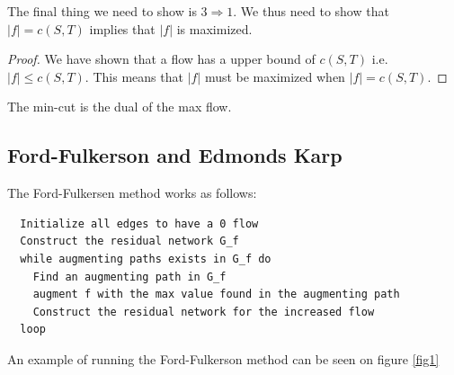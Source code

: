\documentclass[10pt]{article}
\begin{document}
The final thing we need to show is $3 \Rightarrow 1$. We thus need to show that $|f| = c(S,T)$ implies that $|f|$ is maximized. 

\begin{proof}
  We have shown that a flow has a upper bound of $c(S,T)$ i.e. $|f| \leq c(S,T)$. This means that $|f|$ must be maximized when $|f| = c(S,T)$.  
\end{proof}

The min-cut is the dual of the max flow.
                                                          
\subsection{Ford-Fulkerson and Edmonds Karp} %
\label{sub:ford_fulkerson_and_edmonds_karp}
The Ford-Fulkersen method works as follows:
\begin{verbatim}
  Initialize all edges to have a 0 flow
  Construct the residual network G_f   
  while augmenting paths exists in G_f do
    Find an augmenting path in G_f
    augment f with the max value found in the augmenting path 
    Construct the residual network for the increased flow
  loop 
\end{verbatim}

An example of running the Ford-Fulkerson method can be seen on figure \ref{fig1}
\end{document}
